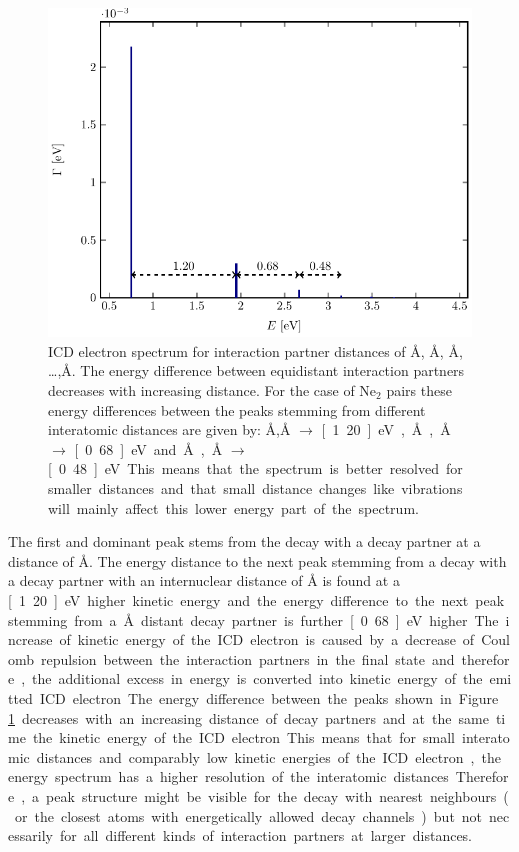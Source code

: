 \begin{figure}[h]
 \centering
 \includegraphics[width=\columnwidth]{pics/model_EGamma.pdf}
 \caption{ICD electron spectrum for interaction partner distances of
          \unit[3]{\AA}, \unit[4]{\AA}, \unit[5]{\AA}, \dots ,\unit[9]{\AA}.
          The energy difference between equidistant interaction partners
          decreases with increasing distance. For the case of Ne$_2$ pairs
          these energy differences between the peaks stemming from different
          interatomic distances are given by:
          \unit[3]{\AA},\unit[4]{\AA} $\rightarrow$ \unit[1.20]{eV},
          \unit[4]{\AA},\unit[5]{\AA} $\rightarrow$ \unit[0.68]{eV} and
          \unit[5]{\AA},\unit[6]{\AA} $\rightarrow$ \unit[0.48]{eV}.
          This means that the spectrum is better resolved for smaller distances
          and that small distance changes like vibrations will mainly affect
          this lower energy part of the spectrum.
}
 \label{figure:model_EGamma}
\end{figure}

The first and dominant peak stems from the decay with a decay
partner at a distance of \unit[3]{\AA}. The energy distance to the next peak
stemming from a decay with a decay partner with an internuclear distance of
\unit[4]{\AA} is found at a \unit[1.20]{eV} higher kinetic energy and the
energy difference to the next peak stemming from a \unit[5]{\AA} distant
decay partner is further \unit[0.68]{eV} higher. The increase of kinetic
energy of the ICD electron is caused by a decrease of Coulomb repulsion between
the interaction partners in the final state and therefore, the additional
excess in energy is converted into kinetic energy of the emitted ICD electron.
The energy difference between the peaks shown in Figure \ref{figure:model_EGamma}
decreases with an increasing distance of decay partners and at the same time
the kinetic energy
of the ICD electron. This means that for small interatomic distances and
comparably low kinetic energies of the ICD electron, the energy spectrum
has a higher resolution of the interatomic distances.
Therefore, a peak structure might be visible for the decay with nearest
neighbours (or the closest atoms with energetically allowed decay channels)
but not necessarily for all different kinds of interaction partners at larger
distances.

